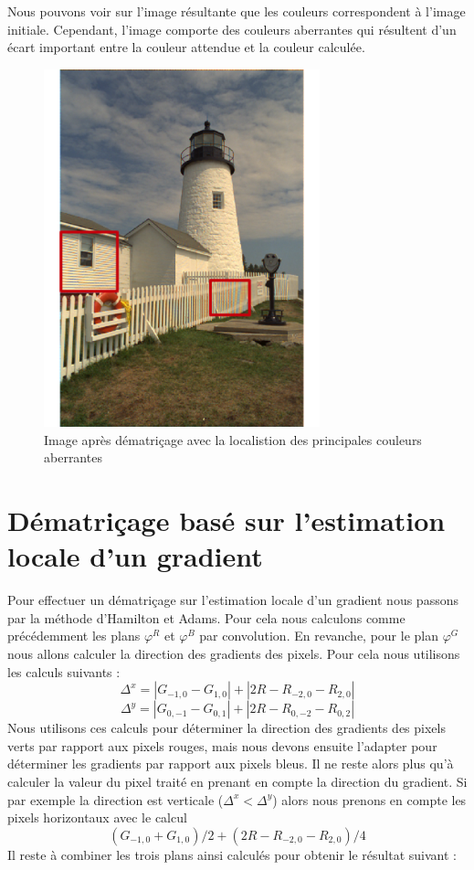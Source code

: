 \documentclass[a4paper,11pt]{article}
\begin{document}
   Nous pouvons voir sur l'image résultante que les couleurs correspondent à l'image initiale. Cependant,
   l'image comporte des couleurs aberrantes qui résultent d'un écart important entre la couleur attendue
   et la couleur calculée.

  \begin{figure}[H]
  \center
   \includegraphics[width=8cm]{../result2ROI.png}
   \caption{Image après dématriçage avec la localistion des principales couleurs aberrantes}
  \end{figure}
   
  \section{Dématriçage basé sur l'estimation locale d'un gradient}
  Pour effectuer un dématriçage sur l'estimation locale d'un gradient nous passons par la méthode d'Hamilton et Adams.
  Pour cela nous calculons comme précédemment les plans $\varphi^R$ et $\varphi^B$ par convolution. En revanche, pour le plan
  $\varphi^G$ nous allons calculer la direction des gradients des pixels. Pour cela nous utilisons les calculs suivants :
  $$\Delta^x=|G_{-1,0}-G_{1,0}| + |2R-R_{-2,0}-R_{2,0}|$$
  $$\Delta^y=|G_{0,-1}-G_{0,1}| + |2R-R_{0,-2}-R_{0,2}|$$
  Nous utilisons ces calculs pour déterminer la direction des gradients des pixels verts par rapport aux pixels rouges, mais nous 
  devons ensuite l'adapter pour déterminer les gradients par rapport aux pixels bleus. Il ne reste alors plus qu'à 
  calculer la valeur du pixel traité en prenant en compte la direction du gradient. Si par exemple la direction est 
  verticale ($\Delta^x<\Delta^y$) alors nous prenons en compte les pixels horizontaux avec le calcul 
  $$(G_{-1,0}+G_{1,0})/2 + (2R-R_{-2,0}-R_{2,0})/4$$
  Il reste à combiner les trois plans ainsi calculés pour obtenir le résultat suivant :
  
\end{document}
